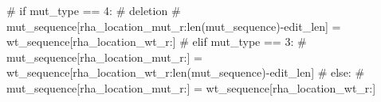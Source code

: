     # if mut_type == 4: # deletion
    #     mut_sequence[rha_location_mut_r:len(mut_sequence)-edit_len] = wt_sequence[rha_location_wt_r:]
    # elif mut_type == 3:
    #     mut_sequence[rha_location_mut_r:] = wt_sequence[rha_location_wt_r:len(mut_sequence)-edit_len]
    # else:
    #     mut_sequence[rha_location_mut_r:] = wt_sequence[rha_location_wt_r:]